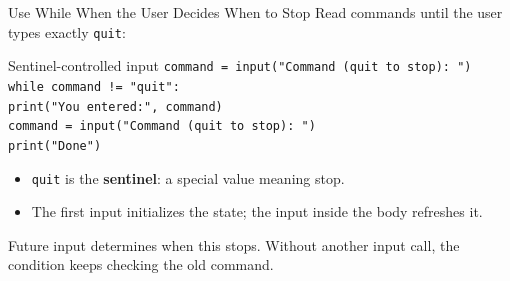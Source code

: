 \documentclass[aspectratio=169,10pt]{beamer}
\begin{document}
\begin{frame}[t]{Use While When the User Decides When to Stop}
  \small
  Read commands until the user types exactly \texttt{quit}:
  \begin{block}{Sentinel-controlled input}
    \texttt{command = input("Command (quit to stop): ")}\\
    \texttt{while command != "quit":}\\
    \hspace{0.20in}\texttt{print("You entered:", command)}\\
    \hspace{0.20in}\texttt{command = input("Command (quit to stop): ")}\\
    \texttt{print("Done")}
  \end{block}
  \begin{itemize}
    \item \texttt{quit} is the \textbf{sentinel}: a special value meaning stop.
    \item The first input initializes the state; the input inside the body refreshes it.
  \end{itemize}
  \begin{keyidea}
    Future input determines when this stops. Without another input call, the condition keeps checking the old command.
  \end{keyidea}
\end{frame}
\end{document}
